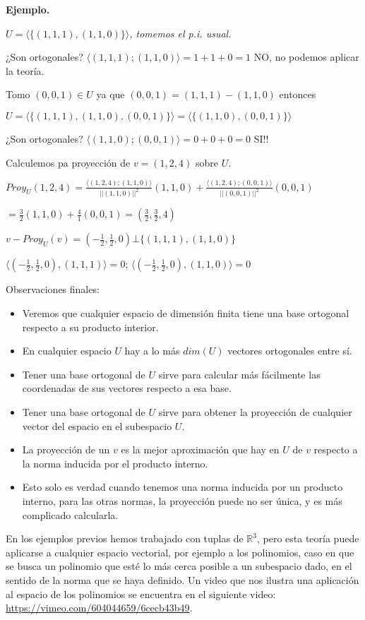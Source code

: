 \documentclass[12pt]{book}
\def\R{\mathbb{R}}
\begin{document}
{ 

{\bf Ejemplo.} {\em 
$U=\langle\{(1,1,1), (1,1,0)\}\rangle$, tomemos el p.i. usual.

¿Son ortogonales? $\langle(1,1,1);(1,1,0)\rangle=1+1+0=1$ NO, no podemos aplicar la teoría.

Tomo $(0,0,1)\in U$ ya que $(0,0,1)=(1,1,1)-(1,1,0)$ entonces 

$U=\langle\{(1,1,1), (1,1,0),(0,0,1)\}\rangle=\langle\{(1,1,0),(0,0,1)\}\rangle$


¿Son ortogonales? $\langle(1,1,0);(0,0,1)\rangle=0+0+0=0$ SI!!

Calculemos pa proyección de $v=(1,2,4)$ sobre $U$.

$Proy_U (1,2,4)=\frac{\langle (1,2,4);(1,1,0)\rangle}{||(1,1,0)||^2}(1,1,0)+\frac{\langle (1,2,4);(0,0,1)\rangle}{||(0,0,1)||^2}(0,0,1)$

$= \frac{3}{2}(1,1,0)+\frac{4}{1}(0,0,1)=(\frac{3}{2},\frac{3}{2},4)$

$v-Proy_U(v) =(-\frac{1}{2},\frac{1}{2},0)\bot \{(1,1,1), (1,1,0)\}$

$\langle(-\frac{1}{2},\frac{1}{2},0),(1,1,1)\rangle=0$; \quad $\langle(-\frac{1}{2},\frac{1}{2},0),(1,1,0)\rangle=0$

}


 
Observaciones finales:

\begin{itemize}
\item Veremos que cualquier espacio de dimensión finita tiene una base ortogonal respecto a su producto interior.
\item En cualquier espacio $U$ hay a lo más $dim(U)$ vectores ortogonales entre sí.
\item Tener una base ortogonal de $U$ sirve para calcular más fácilmente las coordenadas de sus vectores respecto a esa base.
\item Tener una base ortogonal de $U$ sirve para obtener la proyección de cualquier vector del espacio en el subespacio $U$.
\item La proyección de un $v$ es la mejor aproximación que hay en $U$ de $v$ respecto a la norma inducida por el producto interno.
  \item Esto solo es verdad cuando tenemos una norma inducida por un producto interno, para las otras normas, la proyección puede no ser única, y es más complicado calcularla.
\end{itemize}

En los ejemplos previos hemos trabajado con tuplas de $\R^3$, pero esta teoría puede aplicarse a cualquier espacio vectorial, por ejemplo a los polinomios, caso en que se busca un polinomio que esté lo más cerca posible a un subespacio dado, en el sentido de la norma que se haya definido.
Un video que nos ilustra una aplicación al espacio de los polinomios se encuentra en el siguiente video: \url{https://vimeo.com/604044659/6cecb43b49}.

}
\end{document}
